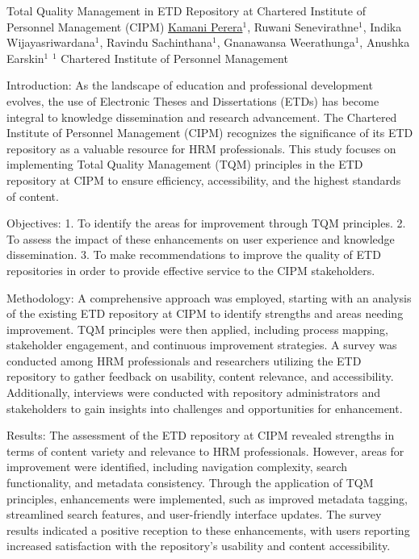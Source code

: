 \begin{abstract_online}{Total Quality Management in ETD Repository at Chartered Institute of Personnel Management (CIPM)}{%
    \underline{Kamani Perera}$^{1}$, Ruwani Senevirathne$^{1}$, Indika Wijayasriwardana$^{1}$, Ravindu Sachinthana$^{1}$, Gnanawansa Weerathunga$^{1}$, Anushka Earskin$^{1}$}{%
    }{%
    $^1$ Chartered Institute of Personnel Management}

Introduction: As the landscape of education and professional development evolves, the use of Electronic Theses and Dissertations (ETDs) has become integral to knowledge dissemination and research advancement. The Chartered Institute of Personnel Management (CIPM) recognizes the significance of its ETD repository as a valuable resource for HRM professionals. This study focuses on implementing Total Quality Management (TQM) principles in the ETD repository at CIPM to ensure efficiency, accessibility, and the highest standards of content.

Objectives:
1. To identify the areas for improvement through TQM principles.
2. To assess the impact of these enhancements on user experience and knowledge dissemination.
3. To make recommendations to improve the quality of ETD repositories in order to provide effective service to the CIPM stakeholders.

Methodology: A comprehensive approach was employed, starting with an analysis of the existing ETD repository at CIPM to identify strengths and areas needing improvement. TQM principles were then applied, including process mapping, stakeholder engagement, and continuous improvement strategies. A survey was conducted among HRM professionals and researchers utilizing the ETD repository to gather feedback on usability, content relevance, and accessibility. Additionally, interviews were conducted with repository administrators and stakeholders to gain insights into challenges and opportunities for enhancement.

Results: The assessment of the ETD repository at CIPM revealed strengths in terms of content variety and relevance to HRM professionals. However, areas for improvement were identified, including navigation complexity, search functionality, and metadata consistency. Through the application of TQM principles, enhancements were implemented, such as improved metadata tagging, streamlined search features, and user-friendly interface updates. The survey results indicated a positive reception to these enhancements, with users reporting increased satisfaction with the repository's usability and content accessibility.


\end{abstract_online}
